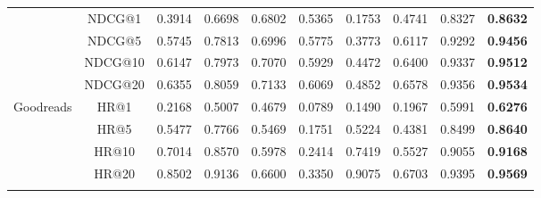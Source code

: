 \begin{table}[]
\begin{tabular}{|c|c|lllllllc|}
                                                                                        & NDCG@1  & 0.3914                      & 0.6698                    & 0.6802                    & 0.5365                  & 0.1753                     & 0.4741                    & 0.8327                   & \textbf{0.8632} \\
                                                                                        & NDCG@5  & 0.5745                      & 0.7813                    & 0.6996                    & 0.5775                  & 0.3773                     & 0.6117                    & 0.9292                   & \textbf{0.9456} \\
                                                                                        & NDCG@10 & 0.6147                      & 0.7973                    & 0.7070                    & 0.5929                  & 0.4472                     & 0.6400                    & 0.9337                   & \textbf{0.9512} \\
                                                                                        & NDCG@20 & 0.6355                      & 0.8059                    & 0.7133                    & 0.6069                  & 0.4852                     & 0.6578                    & 0.9356                   & \textbf{0.9534} \\ \hline
\multirow{8}{*}{Goodreads}                                                              & HR@1    & 0.2168                      & 0.5007                    & 0.4679                    & 0.0789                  & 0.1490                     & 0.1967                    & 0.5991                   & \textbf{0.6276} \\
                                                                                        & HR@5    & 0.5477                      & 0.7766                    & 0.5469                    & 0.1751                  & 0.5224                     & 0.4381                    & 0.8499                   & \textbf{0.8640} \\
                                                                                        & HR@10   & 0.7014                      & 0.8570                    & 0.5978                    & 0.2414                  & 0.7419                     & 0.5527                    & 0.9055                   & \textbf{0.9168} \\
                                                                                        & HR@20   & 0.8502                      & 0.9136                    & 0.6600                    & 0.3350                  & 0.9075                     & 0.6703                    & 0.9395                   & \textbf{0.9569} \\ \cline{2-2}

\end{tabular}
\end{table}
